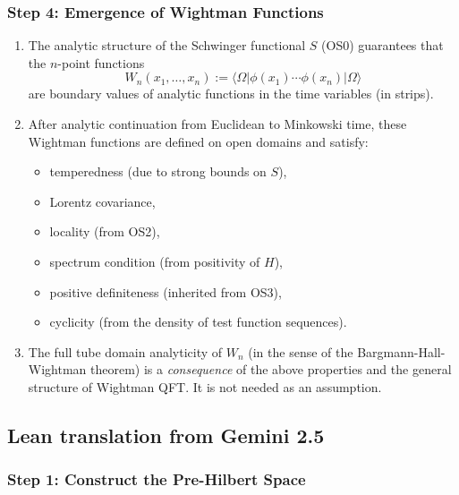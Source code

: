 \documentclass{article}
\newcommand{\1}{\mathbbm{1}}
\theoremstyle{plain}
\theoremstyle{definition}
\numberwithin{equation}{section}
\begin{document}
\subsubsection*{Step 4: Emergence of Wightman Functions}

\begin{enumerate}
  \item The analytic structure of the Schwinger functional $S$ (OS0) guarantees that the $n$-point functions
  \[
  W_n(x_1, \dots, x_n) := \langle \Omega | \phi(x_1) \cdots \phi(x_n) | \Omega \rangle
  \]
  are boundary values of analytic functions in the time variables (in strips).

  \item After analytic continuation from Euclidean to Minkowski time, these Wightman functions are defined on open domains and satisfy:
  \begin{itemize}
    \item temperedness (due to strong bounds on $S$),
    \item Lorentz covariance,
    \item locality (from OS2),
    \item spectrum condition (from positivity of $H$),
    \item positive definiteness (inherited from OS3),
    \item cyclicity (from the density of test function sequences).
  \end{itemize}

  \item The full tube domain analyticity of $W_n$ (in the sense of the Bargmann-Hall-Wightman theorem) is a \emph{consequence} of the above properties and the general structure of Wightman QFT. It is not needed as an assumption.
\end{enumerate}

\subsection{Lean translation from Gemini 2.5}

\subsubsection*{Step 1: Construct the Pre-Hilbert Space}
\end{document}
